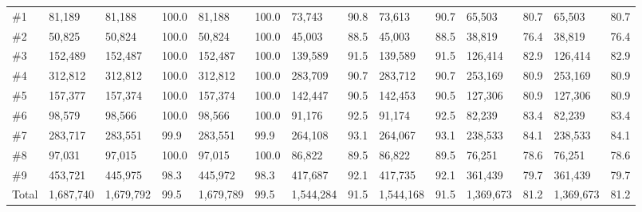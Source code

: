 \begin{table}[]
{\begin{tabular}{llllllllllllll}
\#1                    & 81,189                        & 81,188          & 100.0      & 81,188        & 100.0    & 73,743        & 90.8     & 73,613        & 90.7    & 65,503        & 80.7    & 65,503        & 80.7    \\
\#2                    & 50,825                        & 50,824          & 100.0      & 50,824        & 100.0    & 45,003        & 88.5     & 45,003        & 88.5    & 38,819        & 76.4    & 38,819        & 76.4    \\
\#3                    & 152,489                       & 152,487         & 100.0      & 152,487       & 100.0    & 139,589       & 91.5     & 139,589       & 91.5    & 126,414       & 82.9    & 126,414       & 82.9    \\
\#4                    & 312,812                       & 312,812         & 100.0      & 312,812       & 100.0    & 283,709       & 90.7     & 283,712       & 90.7    & 253,169       & 80.9    & 253,169       & 80.9    \\
\#5                    & 157,377                       & 157,374         & 100.0      & 157,374       & 100.0    & 142,447       & 90.5     & 142,453       & 90.5    & 127,306       & 80.9    & 127,306       & 80.9    \\
\#6                    & 98,579                        & 98,566          & 100.0      & 98,566        & 100.0    & 91,176        & 92.5     & 91,174        & 92.5    & 82,239        & 83.4    & 82,239        & 83.4    \\
\#7                    & 283,717                       & 283,551         & 99.9       & 283,551       & 99.9     & 264,108       & 93.1     & 264,067       & 93.1    & 238,533       & 84.1    & 238,533       & 84.1    \\
\#8                    & 97,031                        & 97,015          & 100.0      & 97,015        & 100.0    & 86,822        & 89.5     & 86,822        & 89.5    & 76,251        & 78.6    & 76,251        & 78.6    \\
\#9                    & 453,721                       & 445,975         & 98.3       & 445,972       & 98.3     & 417,687       & 92.1     & 417,735       & 92.1    & 361,439       & 79.7    & 361,439       & 79.7    \\
\midrule
Total                  & 1,687,740                     & 1,679,792       & 99.5       & 1,679,789     & 99.5     & 1,544,284     & 91.5     & 1,544,168     & 91.5    & 1,369,673     & 81.2    & 1,369,673     & 81.2   \\

\bottomrule

\end{tabular}
}
\end{table}